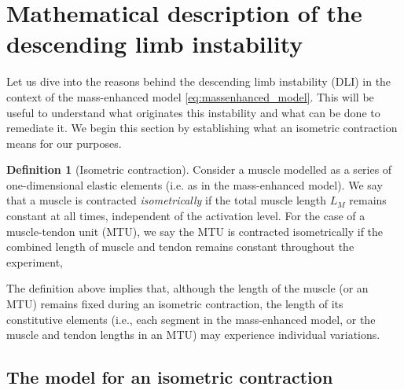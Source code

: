 \documentclass{sfuthesis}
\numberwithin{equation}{section}
\numberwithin{figure}{chapter}
\numberwithin{table}{chapter}
\theoremstyle{definition}
\newtheorem{definition}{Definition}[chapter]
\begin{document}
\section{Mathematical description of the descending limb instability}

Let us dive into the reasons behind the descending limb instability (DLI) in the context of the mass-enhanced model \eqref{eq:massenhanced_model}. This will be useful to understand what originates this instability and what can be done to remediate it. We begin this section by establishing what an isometric contraction means for our purposes.

\begin{definition}[Isometric contraction]
    Consider a muscle modelled as a series of one-dimensional elastic elements (i.e. as in the mass-enhanced model). We say that a muscle is contracted \textit{isometrically} if the total muscle length $L_M$ remains constant at all times, independent of the activation level. For the case of a muscle-tendon unit (MTU), we say the MTU is contracted isometrically if the combined length of muscle and tendon remains constant throughout the experiment, 
\end{definition}

The definition above implies that, although the length of the muscle (or an MTU) remains fixed during an isometric contraction, the length of its constitutive elements (i.e., each segment in the mass-enhanced model, or the muscle and tendon lengths in an MTU) may experience individual variations.

\subsection{The model for an isometric contraction}
\end{document}
